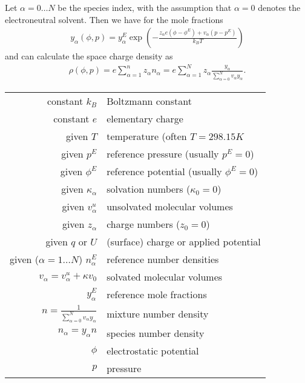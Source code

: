 \documentclass[12pt,oneside,reqno]{amsart}
\begin{document}
Let $\alpha=0\dots N$ be the species index, with the assumption that $\alpha=0$ denotes
the electroneutral solvent.
Then we have for the mole fractions
\begin{align}\label{eq:y}
  y_\alpha(\phi,p)= y_\alpha^E\exp\left( - \frac{z_\alpha e (\phi-\phi^E) + v_\alpha(p-p^E)}{k_BT}\right)
\end{align}
and can calculate the space charge density as
\begin{align}\label{eq:rho}
  \rho(\phi,p) = e\sum_{\alpha=1}^n z_\alpha n_\alpha = e\sum_{\alpha=1}^N z_\alpha \frac{y_\alpha}{\sum_{\alpha=0}^N v_\alpha y_\alpha}.
\end{align}
\medskip

\begin{tabular}{|r|l|}
  \hline
  constant $k_B$                                    & Boltzmann constant                       \\
  constant $e$                                      & elementary charge                        \\
  given $T$                                         & temperature  (often $T=298.15K$          \\
  given $p^E$                                       & reference pressure (usually $p^E=0$)     \\
  given $\phi^E$                                    & reference potential (usually $\phi^E=0$) \\
  given $\kappa_\alpha$                             & solvation numbers ($\kappa_0=0$)         \\
  given $v_\alpha^u$                                & unsolvated molecular volumes             \\
  given $z_\alpha$                                  & charge numbers ($z_0=0$)                 \\
  given $q$ or $U$                                  & (surface) charge or applied potential    \\
  given ($\alpha=1\dots N$) $n_\alpha^E$            & reference number densities               \\
  $v_\alpha= v_\alpha^u+\kappa v_0$                 & solvated molecular volumes               \\
  $y_\alpha^E$                                      & reference mole fractions                 \\
  $n=\frac{1}{\sum_{\alpha=0}^N v_\alpha y_\alpha}$ & mixture number density                   \\
  $n_\alpha = y_\alpha n$                           & species number density                   \\
  $\phi$                                            & electrostatic potential                  \\
  $p$                                               & pressure                                 \\
  \hline
\end{tabular}
\bigskip
\end{document}
